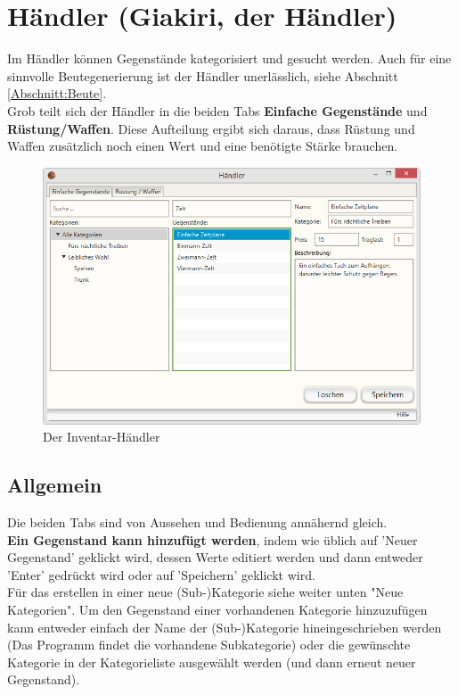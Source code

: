 \documentclass[11pt, a4paper, german]{article}
\begin{document}
\clearpage
\section{Händler (Giakiri, der Händler)}\label{Abschnitt:Haendler}
Im Händler können Gegenstände kategorisiert und gesucht werden. Auch für eine sinnvolle Beutegenerierung ist der Händler unerlässlich, siehe Abschnitt \ref{Abschnitt:Beute}.\\
Grob teilt sich der Händler in die beiden Tabs \textbf{Einfache Gegenstände} und \textbf{Rüstung/Waffen}.
Diese Aufteilung ergibt sich daraus, dass Rüstung und Waffen zusätzlich noch einen Wert und eine benötigte Stärke brauchen.
\begin{figure}
\centering
\includegraphics[width=1\linewidth]{Bilder/InventarHaendler.png}
\caption{Der Inventar-Händler}
\label{fig:Inventarhaendler}
\end{figure}
\subsection{Allgemein}
Die beiden Tabs sind von Aussehen und Bedienung annähernd gleich.\\

\textbf{Ein Gegenstand kann hinzufügt werden}, indem wie üblich auf 'Neuer Gegenstand' geklickt wird, dessen Werte editiert werden und dann entweder 'Enter' gedrückt wird oder auf 'Speichern' geklickt wird. \\
Für das erstellen in einer neue (Sub-)Kategorie siehe weiter unten "Neue Kategorien". Um den Gegenstand einer vorhandenen Kategorie hinzuzufügen kann entweder einfach der Name der (Sub-)Kategorie hineingeschrieben werden (Das Programm findet die vorhandene Subkategorie) oder die gewünschte Kategorie in der Kategorieliste ausgewählt werden (und dann erneut neuer Gegenstand).\\
\end{document}
